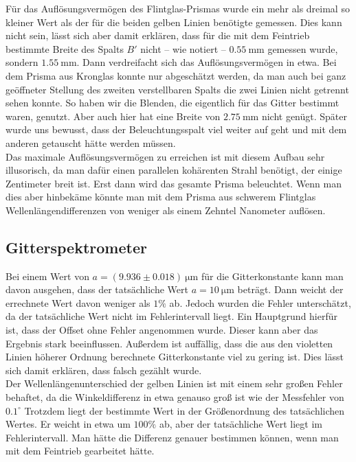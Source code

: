 \documentclass[12pt,a4paper,titlepage,headinclude,bibtotoc]{scrartcl}
\begin{document}
Für das Auflösungsvermögen des Flintglas-Prismas wurde ein mehr als dreimal so kleiner Wert als der für die beiden gelben Linien benötigte gemessen.
Dies kann nicht sein, lässt sich aber damit erklären, dass für die mit dem Feintrieb bestimmte Breite des Spalts $B'$ nicht -- wie notiert -- $0.55~$mm gemessen wurde, sondern $1.55~$mm.
Dann verdreifacht sich das Auflösungsvermögen in etwa.
Bei dem Prisma aus Kronglas konnte nur abgeschätzt werden, da man auch bei ganz geöffneter Stellung des zweiten verstellbaren Spalts die zwei Linien nicht getrennt sehen konnte.
So haben wir die Blenden, die eigentlich für das Gitter bestimmt waren, genutzt.
Aber auch hier hat eine Breite von $2.75~$mm nicht genügt.
Später wurde uns bewusst, dass der Beleuchtungsspalt viel weiter auf geht und mit dem anderen getauscht hätte werden müssen.\\

Das maximale Auflösungsvermögen zu erreichen ist mit diesem Aufbau sehr illusorisch, da man dafür einen parallelen kohärenten Strahl benötigt, der einige Zentimeter breit ist.
Erst dann wird das gesamte Prisma beleuchtet.
Wenn man dies aber hinbekäme könnte man mit dem Prisma aus schwerem Flintglas Wellenlängendifferenzen von weniger als einem Zehntel Nanometer auflösen.

\subsection{Gitterspektrometer}
Bei einem Wert von $a=(9.936 \pm 0.018)~\si{\micro\meter}$ für die Gitterkonstante kann man davon ausgehen, dass der tatsächliche Wert $a=10~\si{\micro\meter}$ beträgt.
Dann weicht der errechnete Wert davon weniger als $1\%$ ab.
Jedoch wurden die Fehler unterschätzt, da der tatsächliche Wert nicht im Fehlerintervall liegt.
Ein Hauptgrund hierfür ist, dass der Offset ohne Fehler angenommen wurde.
Dieser kann aber das Ergebnis stark beeinflussen.
Außerdem ist auffällig, dass die aus den violetten Linien höherer Ordnung berechnete Gitterkonstante viel zu gering ist.
Dies lässt sich damit erklären, dass falsch gezählt wurde.\\

Der Wellenlängenunterschied der gelben Linien ist mit einem sehr großen Fehler behaftet, da die Winkeldifferenz in etwa genauso groß ist wie der Messfehler von $0.1^\circ$
Trotzdem liegt der bestimmte Wert in der Größenordnung des tatsächlichen Wertes.
Er weicht in etwa um $100\%$ ab, aber der tatsächliche Wert liegt im Fehlerintervall.
Man hätte die Differenz genauer bestimmen können, wenn man mit dem Feintrieb gearbeitet hätte.\\
\end{document}
